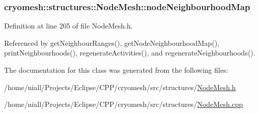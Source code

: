 \hypertarget{classcryomesh_1_1structures_1_1NodeMesh_a506e0ef94a257773bdfa68ef52d57387}{
\subsubsection[{node\-Neighbourhood\-Map}]{ {\bf cryomesh\-::structures\-::\-Node\-Mesh\-::node\-Neighbourhood\-Map}}}\label{classcryomesh_1_1structures_1_1NodeMesh_a506e0ef94a257773bdfa68ef52d57387}


\-Definition at line 205 of file \-Node\-Mesh.\-h.



\-Referenced by get\-Neighbour\-Ranges(), get\-Node\-Neighbourhood\-Map(), print\-Neighbourhoods(), regenerate\-Activities(), and regenerate\-Neighbourhoods().



\-The documentation for this class was generated from the following files\-:\begin{DoxyCompactItemize}
\item 
/home/niall/\-Projects/\-Eclipse/\-C\-P\-P/cryomesh/src/structures/\hyperlink{NodeMesh_8h}{\-Node\-Mesh.\-h}\item 
/home/niall/\-Projects/\-Eclipse/\-C\-P\-P/cryomesh/src/structures/\hyperlink{NodeMesh_8cpp}{\-Node\-Mesh.\-cpp}\end{DoxyCompactItemize}
